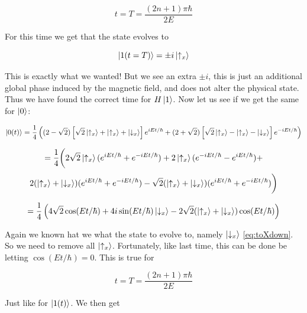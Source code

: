 \documentclass[a4paper,norsk, 10pt]{article}
\begin{document}
\begin{equation}
t = T = \frac{(2n + 1)\pi\hbar}{2E}
\end{equation}

For this time we get that the state evolves to

\begin{equation}
\ket{1(t = T)} = 
\pm i \ket{\uparrow_x}
\end{equation}\label{eq:upEvolved}

This is exactly what we wanted! But we see an extra $\pm i$, this is just an additional global phase induced by the magnetic field, and does not alter the physical state. Thus we have found the correct time for $H\ket{1}$. Now let us see if we get the same for $\ket{0}$:

\begin{equation}
\ket{0(t)} =
\frac{1}{4}\left((2-\sqrt{2})\left[\sqrt{2}\ket{\uparrow_x} + \ket{\uparrow_x} + \ket{\downarrow_x}\right] e^{iEt/\hbar} + (2+\sqrt{2})\left[\sqrt{2}\ket{\uparrow_x} - \ket{\uparrow_x} - \ket{\downarrow_x}\right]e^{-iEt/\hbar}\right)
\end{equation}

\begin{equation}
=\frac{1}{4}\bigg(2\sqrt{2}\ket{\uparrow_x}(e^{iEt/\hbar} + e^{-iEt/\hbar}) 
+ 2\ket{\uparrow_x}(e^{-iEt/\hbar} - e^{iEt/\hbar}) + 
\end{equation}
\begin{equation}
2(\ket{\uparrow_x} + \ket{\downarrow_x})(e^{iEt/\hbar} + e^{-iEt/\hbar}) 
-\sqrt{2}(\ket{\uparrow_x} + \ket{\downarrow_x})(e^{iEt/\hbar} + e^{-iEt/\hbar}) 
\bigg)
\end{equation}

\begin{equation}
= \frac{1}{4}\left(4\sqrt{2}\cos(Et/\hbar) + 4i\sin(Et/\hbar)\ket{\downarrow_x} - 2\sqrt{2}(\ket{\uparrow_x} + \ket{\downarrow_x})\cos(Et/\hbar)\right)
\end{equation}

Again we known hat we what the state to evolve to, namely $\ket{\downarrow_x}$ \eqref{eq:toXdown}. So we need to remove all $\ket{\uparrow_x}$. Fortunately, like last time, this can be done be letting $\cos(Et/\hbar) = 0$. This is true for 

\begin{equation}
t = T = \frac{(2n + 1)\pi\hbar}{2E}
\end{equation}

Just like for $\ket{1(t)}$. We then get
\end{document}
